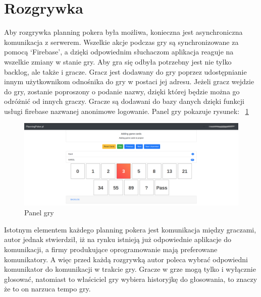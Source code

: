 \section{Rozgrywka}

Aby rozgrywka planning pokera była możliwa,
konieczna jest asynchroniczna komunikacja z serwerem.
Wszelkie akcje podczas gry są synchronizowane za pomocą `Firebase',
a dzięki odpowiednim słuchaczom aplikacja reaguje na wszelkie zmiany w stanie gry.
Aby gra się odbyła potrzebny jest nie tylko backlog, ale także i gracze.
Gracz jest dodawany do gry poprzez udostępnianie innym użytkownikom odnośnika do gry w postaci jej adresu.
Jeżeli gracz wejdzie do gry, zostanie poproszony o podanie nazwy,
dzięki której będzie można go odróżnić od innych graczy.
Gracze są dodawani do bazy danych dzięki funkcji usługi firebase nazwanej anonimowe logowanie.
Panel gry pokazuje rysunek:
~\ref{rys:gra}
\begin{figure}[H]
	\centering\includegraphics[width=.9\textwidth]{img/gra}
	\caption{Panel gry}\label{rys:gra}%
\end{figure}

Istotnym elementem każdego planning pokera jest komunikacja między graczami,
autor jednak stwierdził,
iż na rynku istnieją już odpowiednie aplikacje do komunikacji,
a firmy produkujące oprogramowanie mają preferowane komunikatory.
A więc przed każdą rozgrywką autor poleca wybrać odpowiedni komunikator do komunikacji w trakcie gry.
Gracze w grze mogą tylko i wyłącznie głosować,
natomiast to właściciel gry wybiera historyjkę do głosowania, to znaczy że to on narzuca tempo gry.